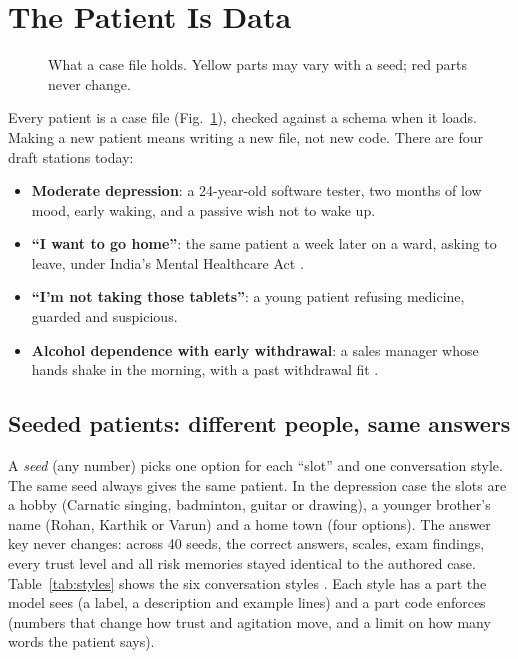\documentclass{article}
\begin{document}
\section{The Patient Is Data}

\begin{figure}[t]
\caption{What a case file holds. Yellow parts may vary with a seed; red parts never change.}
\label{fig:case}
\end{figure}

Every patient is a case file (Fig.~\ref{fig:case}), checked against a schema when it loads. Making a new patient means writing a new file, not new
code. There are four draft stations today:
\begin{itemize}
\item \textbf{Moderate depression}: a 24-year-old software tester, two months of low mood, early waking, and a passive wish not to wake up.
\item \textbf{``I want to go home''}: the same patient a week later on a ward, asking to leave, under India's Mental Healthcare Act \cite{mhca2017}.
\item \textbf{``I'm not taking those tablets''}: a young patient refusing medicine, guarded and suspicious.
\item \textbf{Alcohol dependence with early withdrawal}: a sales manager whose hands shake in the morning, with a past withdrawal fit
\cite{nice2010cg100}.
\end{itemize}

\subsection{Seeded patients: different people, same answers}
A \emph{seed} (any number) picks one option for each ``slot'' and one conversation style. The same seed always gives the same patient. In the
depression case the slots are a hobby (Carnatic singing, badminton, guitar or drawing), a younger brother's name (Rohan, Karthik or Varun) and a home
town (four options). The answer key never changes: across 40 seeds, the correct answers, scales, exam findings, every trust level and all risk
memories stayed identical to the authored case. Table~\ref{tab:styles} shows the six conversation styles \cite{wang2024patient}. Each style has a
part the model sees (a label, a description and example lines) and a part code enforces (numbers that change how trust and agitation move, and a
limit on how many words the patient says).
\end{document}
